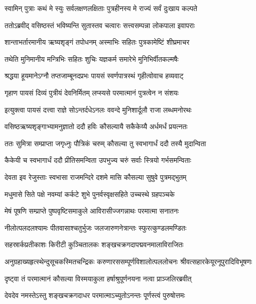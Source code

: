 \twolineshloka
{स्वामिन् पुत्राः कथं मे स्युः सर्वलक्षणलक्षिताः}
{पुत्रहीनस्य मे राज्यं सर्वं दुःखाय कल्पते} %

\twolineshloka
{ततोऽब्रवीद् वसिष्ठस्तं भविष्यन्ति सुतास्तव}
{चत्वारः सत्त्वसम्पन्ना लोकपाला इवापराः} %

\twolineshloka
{शान्ताभर्तारमानीय ऋष्यशृङ्गं तपोधनम्}
{अस्माभिः सहितः पुत्रकामेष्टिं शीघ्रमाचर} %

\twolineshloka
{तथेति मुनिमानीय मन्त्रिभिः सहितः शुचिः}
{यज्ञकर्म समारेभे मुनिभिर्वीतकल्मषैः} %

\twolineshloka
{श्रद्धया हूयमानेऽग्नौ तप्तजाम्बूनदप्रभः}
{पायसं स्वर्णपात्रस्थं गृहीत्वोवाच हव्यवाट्} %

\twolineshloka
{गृहाण पायसं दिव्यं पुत्रीयं देवनिर्मितम्}
{लप्स्यसे परमात्मानं पुत्रत्वेन न संशयः} %

\twolineshloka
{इत्युक्त्वा पायसं दत्त्वा राज्ञे सोऽन्तर्दधेऽनलः}
{ववन्दे मुनिशार्दूलौ राजा लब्धमनोरथः} %

\twolineshloka
{वसिष्ठऋष्यशृङ्गाभ्यामनुज्ञातो ददौ हविः}
{कौसल्यायै सकैकेय्यै अर्धमर्धं प्रयत्नतः} %

\twolineshloka
{ततः सुमित्रा सम्प्राप्ता जगृध्नुः पौत्रिकं चरुम्}
{कौसल्या तु स्वभागार्धं ददौ तस्यै मुदान्विता} %

\twolineshloka
{कैकेयी च स्वभागार्धं ददौ प्रीतिसमन्विता}
{उपभुज्य चरुं सर्वाः स्त्रियो गर्भसमन्विताः} %

\twolineshloka
{देवता इव रेजुस्ताः स्वभासा राजमन्दिरे}
{दशमे मासि कौसल्या सुषुवे पुत्रमद्भुतम्} %

\twolineshloka
{मधुमासे सिते पक्षे नवम्यां कर्कटे शुभे}
{पुनर्वस्वृक्षसहिते उच्चस्थे ग्रहपञ्चके} %

\twolineshloka
{मेषं पूषणि सम्प्राप्ते पुष्पवृष्टिसमाकुले}
{आविरासीज्जगन्नाथः परमात्मा सनातनः} %

\twolineshloka
{नीलोत्पलदलश्यामः पीतवासाश्चतुर्भुजः}
{जलजारुणनेत्रान्तः स्फुरत्कुण्डलमण्डितः} %

\twolineshloka
{सहस्रार्कप्रतीकाशः किरीटी कुञ्चितालकः}
{शङ्खचक्रगदापद्मवनमालाविराजितः} %

\threelineshloka
{अनुग्रहाख्यहृत्स्थेन्दुसूचकस्मितचन्द्रिकः}
{करुणारससम्पूर्णविशालोत्पललोचनः}
{श्रीवत्सहारकेयूरनूपुरादिविभूषणः} %

\twolineshloka
{दृष्ट्वा तं परमात्मानं कौसल्या विस्मयाकुला}
{हर्षाश्रुपूर्णनयना नत्वा प्राञ्जलिरब्रवीत्} %


\twolineshloka
{देवदेव नमस्तेऽस्तु शङ्खचक्रगदाधर}
{परमात्माऽच्युतोऽनन्तः पूर्णस्त्वं पुरुषोत्तमः} %

